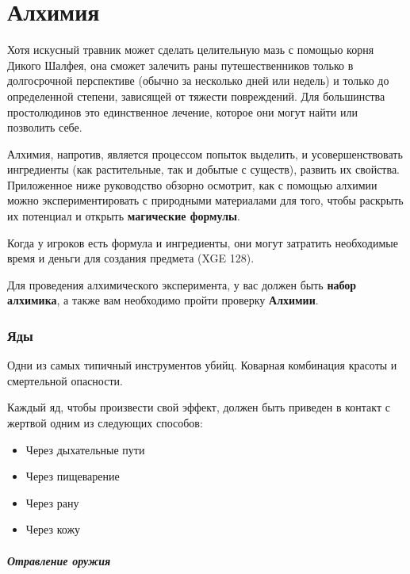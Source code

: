 \documentclass[a4paper, 9pt, twocolumn]{book}
\begin{document}
	\chapter{Алхимия}
	
	Хотя искусный травник может сделать целительную мазь с помощью корня Дикого Шалфея, она сможет залечить раны путешественников только в долгосрочной перспективе (обычно за несколько дней или недель) и только до определенной степени, зависящей от тяжести повреждений. Для большинства простолюдинов это единственное лечение, которое они могут найти или позволить себе.
	
	Алхимия, напротив, является процессом попыток выделить, и усовершенствовать ингредиенты (как растительные, так и добытые с существ), развить их свойства. Приложенное ниже руководство обзорно осмотрит, как с помощью алхимии можно экспериментировать с природными материалами для того, чтобы раскрыть их потенциал и открыть \textbf{магические формулы}.
	
	Когда у игроков есть формула и ингредиенты, они могут затратить необходимые время и деньги для создания предмета (XGE 128).
	
	Для проведения алхимического эксперимента, у вас должен быть \textbf{набор алхимика}, а также вам необходимо пройти проверку \textbf{Алхимии}.
	
	\subsection{Яды}
	
	Одни из самых типичный инструментов убийц. Коварная комбинация красоты и смертельной опасности.
	
	Каждый яд, чтобы произвести свой эффект, должен быть приведен в контакт с жертвой одним из следующих способов:
	
	\begin{itemize}
		\item Через дыхательные пути
		
		\item Через пищеварение
		
		\item Через рану
		
		\item Через кожу
	\end{itemize}

	\paragraph*{Отравление оружия}
	
\end{document}
